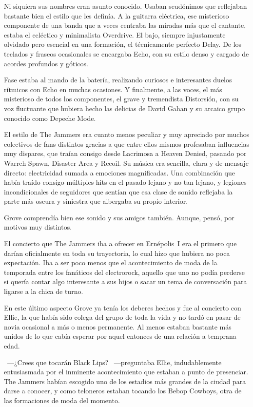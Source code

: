 Ni siquiera sus nombres eran asunto conocido. Usaban seudónimos que reflejaban bastante bien el estilo que les definía. A la guitarra eléctrica, ese misterioso componente de una banda que a veces centraba las miradas más que el cantante, estaba el ecléctico y minimalista Overdrive. El bajo, siempre injustamente olvidado pero esencial en una formación, el técnicamente perfecto Delay. De los teclados y fraseos ocasionales se encargaba Echo, con su estilo denso y cargado de acordes profundos y góticos.

Fase estaba al mando de la batería, realizando curiosos e interesantes duelos rítmicos con Echo en muchas ocasiones. Y finalmente, a las voces, el más misterioso de todos los componentes, el grave y tremendista Distorsión, con su voz fluctuante que hubiera hecho las delicias de David Gahan y su arcaico grupo conocido como Depeche Mode.

El estilo de The Jammers era cuanto menos peculiar y muy apreciado por muchos colectivos de fans distintos gracias a que entre ellos mismos profesaban influencias muy dispares, que traían consigo desde Lacrimosa a Heaven Denied, pasando por Warreh Spawn, Disaster Area y Recoil. Su música era sencilla, clara y de mensaje directo: electricidad sumada a emociones magnificadas. Una combinación que había traído consigo múltiples hits en el pasado lejano y no tan lejano, y legiones incondicionales de seguidores que sentían que esa clase de sonido reflejaba la parte más oscura y siniestra que albergaba su propio interior.

Grove comprendía bien ese sonido y sus amigos también. Aunque, pensó, por motivos muy distintos.

El concierto que The Jammers iba a ofrecer en Ernépolis~I era el primero que darían oficialmente en toda su trayectoria, lo cual hizo que hubiera no poca expectación. Iba a ser poco menos que el acontecimiento de moda de la temporada entre los fanáticos del electrorock, aquello que uno no podía perderse si quería contar algo interesante a sus hijos o sacar un tema de conversación para ligarse a la chica de turno.

En este último aspecto Grove ya tenía los deberes hechos y fue al concierto con Ellie, la que había sido colega del grupo de toda la vida y no tardó en pasar de novia ocasional a más o menos permanente. Al menos estaban bastante más unidos de lo que cabía esperar por aquel entonces de una relación a temprana edad.

~---¿Crees que tocarán Black Lips? ~---preguntaba Ellie, indudablemente entusiasmada por el inminente acontecimiento que estaban a punto de presenciar. The Jammers habían escogido uno de los estadios más grandes de la ciudad para darse a conocer, y como teloneros estaban tocando los Bebop Cowboys, otra de las formaciones de moda del momento.


